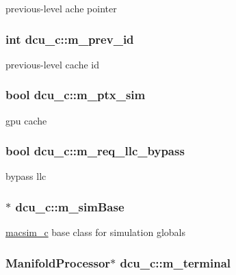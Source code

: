 \label{classdcu__c_a199065735dfd67fbbf17f1e7e73a0b27}
previous-\/level ache pointer \hypertarget{classdcu__c_aab67bf503b09b72441791fc20862c22c}{
\subsubsection[{m\_\-prev\_\-id}]{\setlength{\rightskip}{0pt plus 5cm}int {\bf dcu\_\-c::m\_\-prev\_\-id}}}
\label{classdcu__c_aab67bf503b09b72441791fc20862c22c}
previous-\/level cache id \hypertarget{classdcu__c_a5e56ee48837544fa5f882c9f750fdd43}{
\subsubsection[{m\_\-ptx\_\-sim}]{\setlength{\rightskip}{0pt plus 5cm}bool {\bf dcu\_\-c::m\_\-ptx\_\-sim}}}
\label{classdcu__c_a5e56ee48837544fa5f882c9f750fdd43}
gpu cache \hypertarget{classdcu__c_a9766416e7c7713fe5729a27e6957d80b}{
\subsubsection[{m\_\-req\_\-llc\_\-bypass}]{\setlength{\rightskip}{0pt plus 5cm}bool {\bf dcu\_\-c::m\_\-req\_\-llc\_\-bypass}}}
\label{classdcu__c_a9766416e7c7713fe5729a27e6957d80b}
bypass llc \hypertarget{classdcu__c_aa9cf359040c048b4163f1961bbff1ca1}{
\subsubsection[{m\_\-simBase}]{$\ast$ {\bf dcu\_\-c::m\_\-simBase}}}
\label{classdcu__c_aa9cf359040c048b4163f1961bbff1ca1}
\hyperlink{classmacsim__c}{macsim\_\-c} base class for simulation globals \hypertarget{classdcu__c_a3db9363af3f49592efb1edd8014c2736}{
\subsubsection[{m\_\-terminal}]{\setlength{\rightskip}{0pt plus 5cm}ManifoldProcessor$\ast$ {\bf dcu\_\-c::m\_\-terminal}}}
